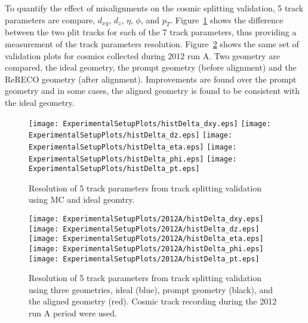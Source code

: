 
To quantify the effect of misalignments on the cosmic splitting 
validation, 5 track parameters are compare, $d_{xy}$, $d_z$,
$\eta$, $\phi$, and $p_T$. Figure~\ref{fig:trackSplittingMC}
shows the difference between the two plit tracks for each of the
7 track parameters, thus providing a measurement of the track
parameters resolution.  Figure~\ref{fig:trackSplitting2012A} shows
the same set of validation plots for cosmics collected during
2012 run A.  Two geometry are compared, the ideal geometry, the 
prompt geometry (before alignment) and the ReRECO geometry (after 
alignment).  Improvements are found over the prompt geometry and
in some cases, the aligned geometry is found to be consistent 
with the ideal geometry.  

\begin{figure}
\begin{center}
\texttt{[image: ExperimentalSetupPlots/histDelta\_dxy.eps]}
\texttt{[image: ExperimentalSetupPlots/histDelta\_dz.eps]}
\texttt{[image: ExperimentalSetupPlots/histDelta\_eta.eps]}
\texttt{[image: ExperimentalSetupPlots/histDelta\_phi.eps]}
\texttt{[image: ExperimentalSetupPlots/histDelta\_pt.eps]}
\label{fig:trackSplittingMC}
\caption{Resolution of 5 track parameters from track splitting validation 
using MC and ideal geomtry. }
\end{center}
\end{figure}

\begin{figure}
\begin{center}
\texttt{[image: ExperimentalSetupPlots/2012A/histDelta\_dxy.eps]}
\texttt{[image: ExperimentalSetupPlots/2012A/histDelta\_dz.eps]}
\texttt{[image: ExperimentalSetupPlots/2012A/histDelta\_eta.eps]}
\texttt{[image: ExperimentalSetupPlots/2012A/histDelta\_phi.eps]}
\texttt{[image: ExperimentalSetupPlots/2012A/histDelta\_pt.eps]}
\label{fig:trackSplitting2012A}
\caption{Resolution of 5 track parameters from track splitting validation 
using three geometries, ideal (blue), prompt geometry (black), and the
aligned geometry (red).  Cosmic track recording during the 2012 run A
period were used.}
\end{center}
\end{figure}

